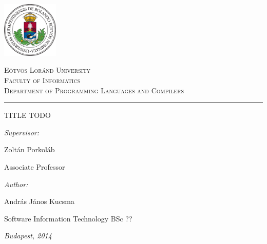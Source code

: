 \begin{titlepage}

\noindent
\parbox[m]{0.2\textwidth}{
    \includegraphics[width=0.2\textwidth]{img/elte_logo_colored.eps} %
}
\hfill
\parbox[m]{0.7\textwidth}{
    \begin{center}
    \begin{large}
    \textsc{
        Eötvös Loránd University\\
        \vspace{0.5pc}
        Faculty of Informatics\\
        \vspace{0.5pc}
        Department of Programming Languages and Compilers\\
    }
    \end{large}
    \end{center}
}

\vspace{1pc}
\hrule

\vfill

\begin{center}
    {\LARGE TITLE TODO}
\end{center}

\vfill

\noindent
\hspace*{0.05\textwidth}
\parbox{0.45\textwidth}{
    {\it Supervisor:}
    \bigskip

    {\Large Zoltán Porkoláb}
    \smallskip

    Associate Professor
}
\hfill
\parbox{0.45\textwidth}{
    {\it Author:}
    \bigskip

    {\Large András János Kucsma}
    \smallskip

    Software Information Technology BSc ??
}


\vfill

\begin{center}
    {\large {\it Budapest, 2014}}
\end{center}

\end{titlepage}
